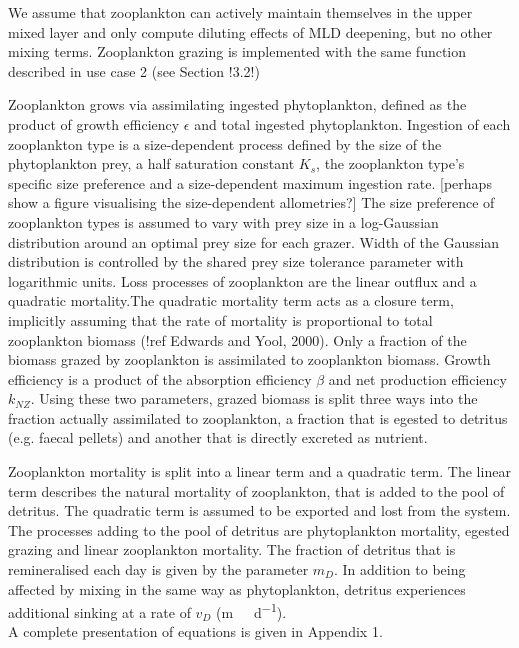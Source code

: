 \documentclass[template.tex]{subfiles}
\begin{document}
We assume that zooplankton can actively maintain themselves in the upper mixed layer and only compute diluting effects of MLD deepening, but no other mixing terms.
Zooplankton grazing is implemented with the same function described in use case 2 (see Section !3.2!) 

Zooplankton grows via assimilating ingested phytoplankton, defined as the product of growth efficiency $\epsilon$ and total ingested phytoplankton. Ingestion of each zooplankton type is a size-dependent process defined by the size of the phytoplankton prey, a half saturation constant $K_s$, the zooplankton type's specific size preference and a size-dependent maximum ingestion rate. [perhaps show a figure visualising the size-dependent allometries?]
The size preference of zooplankton types is assumed to vary with prey size in a log-Gaussian distribution around an optimal prey size for each grazer.
Width of the Gaussian distribution is controlled by the shared prey size tolerance parameter with logarithmic units.
Loss processes of zooplankton are the linear outflux and a quadratic mortality.The quadratic mortality term acts as a closure term, implicitly assuming that the rate of mortality is proportional to total zooplankton biomass (!ref Edwards and Yool, 2000). 
Only a fraction of the biomass grazed by zooplankton is assimilated to zooplankton biomass. Growth efficiency is a product of the absorption efficiency $\beta$ and net production efficiency $k_{NZ}$. Using these two parameters, grazed biomass is split three ways into the fraction actually assimilated to zooplankton, a fraction that is egested to detritus (e.g. faecal pellets) and another that is directly excreted as nutrient. 

Zooplankton mortality is split into a linear term and a quadratic term. The linear term describes the natural mortality of zooplankton, that is added to the pool of detritus. The quadratic term is assumed to be exported and lost from the system.\\

The processes adding to the pool of detritus are phytoplankton mortality, egested grazing and linear zooplankton mortality. The fraction of detritus that is remineralised each day is given by the parameter $m_D$. In addition to being affected by mixing in the same way as phytoplankton, detritus experiences additional sinking at a rate of $v_D$ (\unit{m \ d^{-1}}).\\

A complete presentation of equations is given in Appendix 1.\\
\end{document}
